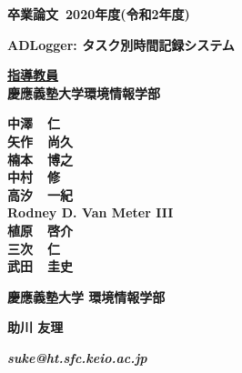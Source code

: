 \pagestyle{empty}

\begin{center}

\vspace{5cm}

\textbf{\Large 卒業論文~2020年度(令和2年度)}

\vspace{2cm}

\textbf{\LARGE ADLogger: タスク別時間記録システム}

\vspace{3cm}

\textbf{\underline{\large 指導教員}}\\
\textbf{慶應義塾大学環境情報学部}

\textbf{\Large 中澤~~仁}\\
\textbf{\Large 矢作~~尚久}\\
\textbf{\Large 楠本~~博之}\\
\textbf{\Large 中村~~修}\\
\textbf{\Large 高汐~~一紀}\\
\textbf{\Large Rodney D. Van Meter III}\\
\textbf{\Large 植原~~啓介}\\
\textbf{\Large 三次~~仁}\\
\textbf{\Large 武田~~圭史}\\

\vspace{6cm}

\textbf{\LARGE 慶應義塾大学 環境情報学部}

\vspace{.5em}

\textbf{\LARGE 助川 友理}

\vspace{.3em}

\textbf{\it suke@ht.sfc.keio.ac.jp}



\newpage

\end{center}

\pagestyle{plain}
